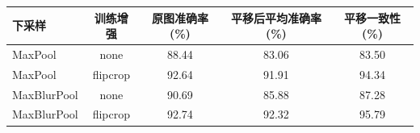 \begin{tabular}{lcccc}
\toprule
下采样 & 训练增强 & 原图准确率 (\%) & 平移后平均准确率 (\%) & 平移一致性 (\%) \\
\midrule
MaxPool & none & 88.44 & 83.06 & 83.50 \\
MaxPool & flipcrop & 92.64 & 91.91 & 94.34 \\
MaxBlurPool & none & 90.69 & 85.88 & 87.28 \\
MaxBlurPool & flipcrop & 92.74 & 92.32 & 95.79 \\
\bottomrule
\end{tabular}
